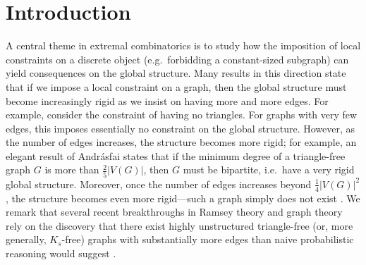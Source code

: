 \documentclass{article}
\begin{document}
\section{Introduction}
A central theme in extremal combinatorics is to study how the imposition of local constraints on a discrete object (e.g.\ forbidding a constant-sized subgraph) can yield consequences on the global structure. Many results in this direction state that if we impose a local constraint on a graph, then the global structure must become increasingly rigid as we insist on having more and more edges. For example, consider the constraint of having no triangles. For graphs with very few edges, this imposes essentially no constraint on the global structure. However, as the number of edges increases, the structure becomes more rigid; for example, an elegant result of Andr\'asfai \cite{A62} states that if the minimum degree of a triangle-free graph $G$ is more than $\frac 25 |V(G)|$, then $G$ must be bipartite, i.e.\ have a very rigid global structure. Moreover, once the number of edges increases beyond $\frac 14 |V(G)|^2$, the structure becomes even more rigid---such a graph simply does not exist \cite{mantel1907vraagstuk}. We remark that several recent breakthroughs in Ramsey theory and graph theory rely on the discovery that there exist highly unstructured triangle-free (or, more generally, $K_s$-free) graphs with substantially more edges than naive probabilistic reasoning would suggest \cite{2605.28793,2505.13371,2510.19718,2512.20392,2607.16118}.
\end{document}
